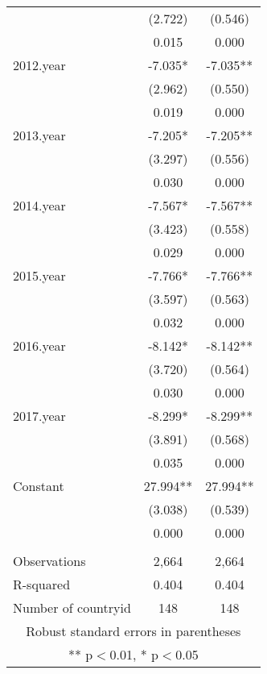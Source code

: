 \begin{tabular}{lcc}
 & (2.722) & (0.546) \\
 & 0.015 & 0.000 \\
2012.year & -7.035* & -7.035** \\
 & (2.962) & (0.550) \\
 & 0.019 & 0.000 \\
2013.year & -7.205* & -7.205** \\
 & (3.297) & (0.556) \\
 & 0.030 & 0.000 \\
2014.year & -7.567* & -7.567** \\
 & (3.423) & (0.558) \\
 & 0.029 & 0.000 \\
2015.year & -7.766* & -7.766** \\
 & (3.597) & (0.563) \\
 & 0.032 & 0.000 \\
2016.year & -8.142* & -8.142** \\
 & (3.720) & (0.564) \\
 & 0.030 & 0.000 \\
2017.year & -8.299* & -8.299** \\
 & (3.891) & (0.568) \\
 & 0.035 & 0.000 \\
Constant & 27.994** & 27.994** \\
 & (3.038) & (0.539) \\
 & 0.000 & 0.000 \\
 &  &  \\
Observations & 2,664 & 2,664 \\
R-squared & 0.404 & 0.404 \\
 Number of countryid & 148 & 148 \\ \hline
\multicolumn{3}{c}{ Robust standard errors in parentheses} \\
\multicolumn{3}{c}{ ** p$<$0.01, * p$<$0.05} \\
\end{tabular}
